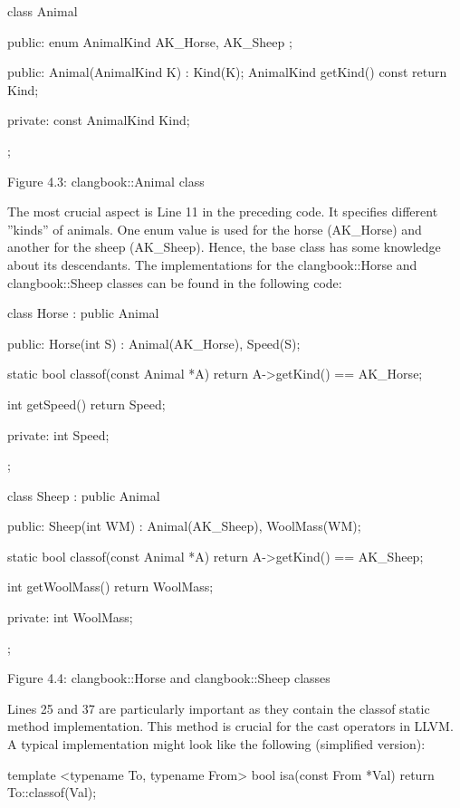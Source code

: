 \begin{cpp}
class Animal {
public:
  enum AnimalKind { AK_Horse, AK_Sheep };

public:
  Animal(AnimalKind K) : Kind(K){};
  AnimalKind getKind() const { return Kind; }

private:
  const AnimalKind Kind;
};
\end{cpp}

\begin{center}
Figure 4.3: clangbook::Animal class
\end{center}

The most crucial aspect is Line 11 in the preceding code. It specifies different ”kinds” of animals. One enum value is used for the horse (AK\_Horse) and another for the sheep (AK\_Sheep). Hence, the base class has some knowledge about its descendants. The implementations for the clangbook::Horse and clangbook::Sheep classes can be found in the following code:

\begin{cpp}
class Horse : public Animal {
public:
  Horse(int S) : Animal(AK_Horse), Speed(S){};

  static bool classof(const Animal *A) { return A->getKind() == AK_Horse; }

  int getSpeed() { return Speed; }

private:
  int Speed;
};

class Sheep : public Animal {
public:
  Sheep(int WM) : Animal(AK_Sheep), WoolMass(WM){};

  static bool classof(const Animal *A) { return A->getKind() == AK_Sheep; }

  int getWoolMass() { return WoolMass; }

private:
  int WoolMass;
};
\end{cpp}

\begin{center}
Figure 4.4: clangbook::Horse and clangbook::Sheep classes
\end{center}

Lines 25 and 37 are particularly important as they contain the classof static method implementation. This method is crucial for the cast operators in LLVM. A typical implementation might look like the following (simplified version):

\begin{cpp}
template <typename To, typename From>
bool isa(const From *Val) {
  return To::classof(Val);
}
\end{cpp}

